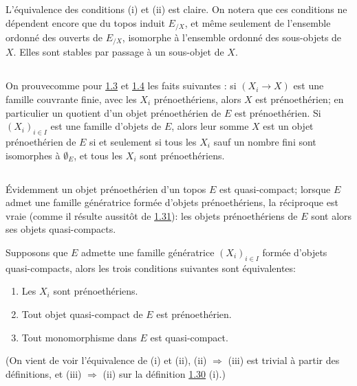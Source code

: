 \subsubsection{}
L'équivalence des conditions (i) et (ii) est claire. On notera que ces
conditions ne dépendent encore que du topos induit $E_{/X}$, et même
seulement de l'ensemble ordonné des ouverts de $E_{/X}$, isomorphe à
l'ensemble ordonné des sous-objets de $X$. Elles sont stables par
passage à un sous-objet de $X$.


\subsection{}
On prouve\pageoriginale comme pour \hyperref[VI.prop1.3]{1.3} et
\hyperref[VI.cor1.4]{1.4} les faits suivantes : si $(X_i \to X)$ est une
famille couvrante finie, avec les $X_i$ prénoethériens, alors $X$
est prénoethérien; en particulier un quotient d'un objet
prénoethérien de $E$ est prénoethérien. Si $(X_i)_{i \in I}$ est une
famille d'objets de $E$, alors leur somme $X$ est un objet
prénoethérien de $E$ si et seulement si tous les $X_i$ sauf un
nombre fini sont isomorphes à $∅_{E}$, et tous les $X_i$
sont prénoethériens.

\subsection{}
Évidemment un objet prénoethérien d'un topos $E$ est quasi-compact;
lorsque $E$ admet une famille génératrice formée d'objets
prénoethériens, la réciproque est vraie (comme il résulte aussitôt
de \hyperref[VI.subsec1.31]{1.31}): les objets prénoethériens de $E$ sont alors
ses objets quasi-compacts.

Supposons que $E$ admette une famille génératrice $(X_i)_{i\in I}$
formée d'objets quasi-compacts, alors les trois conditions suivantes
sont équivalentes:
\begin{enumerate}
\renewcommand{\theenumi}{\roman{enumi}}
\renewcommand{\labelenumi}{(\theenumi)}
\item Les $X_i$ sont prénoethériens.

\item Tout objet quasi-compact de $E$ est prénoethérien.

\item Tout monomorphisme dans $E$ est quasi-compact.
\end{enumerate}
\noindent
(On vient de voir l'équivalence de (i) et (ii), (ii) $\Rightarrow$
(iii) est trivial à partir des définitions, et (iii) $\Rightarrow$
(ii) sur la définition \hyperref[VI.def1.30]{1.30} (i).)

